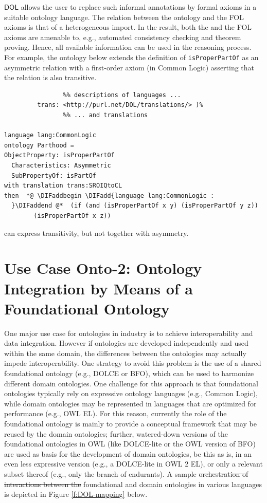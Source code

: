 \documentclass[10pt,fleqn,final]{scrreprt}
\newcommand*{\DOL}{\ensuremath{\mathsf{DOL}}\xspace}
\newenvironment{definitions}[0]{\medskip }{}
\providecommand{\DIFadd}[1]{{\protect\color{blue}\uwave{#1}}} %
\providecommand{\DIFdel}[1]{{\protect\color{red}\sout{#1}}}                      %
\providecommand{\DIFaddbegin}{} %
\providecommand{\DIFaddend}{} %
\providecommand{\DIFdelbegin}{} %
\providecommand{\DIFdelend}{} %
\begin{document}
\begin{definitions}
\DOL allows the user to replace such informal annotations by formal axioms in a suitable ontology 
language. The relation between the \OWL ontology and the FOL axioms is that of a heterogeneous 
import. In the result, both the \OWL and the FOL axioms are amenable to, e.g., automated consistency 
checking and theorem proving. Hence, all available information can be used in the reasoning process.
For example, the ontology below extends the \OWL definition of \texttt{isProperPartOf} as an asymmetric relation
with a first-order axiom (in Common Logic) asserting that the relation is also transitive.
\begin{lstlisting}[basicstyle=\small\ttfamily,language=dolText,alsolanguage=clif,alsolanguage=owl2Manchester,escapechar=@,mathescape]
	 %prefix( lang:  <http://purl.net/DOL/languages/>
                %% descriptions of languages ...
         trans: <http://purl.net/DOL/translations/> )%
                %% ... and translations

language lang:CommonLogic
ontology Parthood =
ObjectProperty: isProperPartOf  
  Characteristics: Asymmetric  
  SubPropertyOf: isPartOf 
with translation trans:SROIQtoCL
then  *@ \DIFaddbegin \DIFadd{language lang:CommonLogic :
  }\DIFaddend @*  (if (and (isProperPartOf x y) (isProperPartOf y z)) 
        (isProperPartOf x z))
\end{lstlisting}
\OWL can express transitivity, but not together with asymmetry.

\section{Use Case Onto-2: Ontology Integration by Means of a Foundational Ontology}\DIFaddbegin \label{onto-2}
\DIFaddend One major use case for ontologies in industry is to achieve interoperability and data integration. 
However if ontologies are developed independently and used  within the same domain, the 
differences between the ontologies may actually impede interoperability. One strategy to avoid this 
problem is the use of a shared  foundational ontology (e.g., DOLCE or BFO), which can be used to 
harmonize different domain ontologies. One challenge for this approach is that foundational 
ontologies typically rely on expressive ontology languages (e.g., Common Logic), while domain 
ontologies may be represented in languages that are optimized for performance (e.g., OWL EL). For 
this reason, currently the role of the foundational ontology is mainly to provide a conceptual 
framework that may be reused by the  domain ontologies; further, watered-down versions of the 
foundational ontologies in OWL (like DOLCE-lite or the OWL version of BFO) are used as basis for 
the  development of domain ontologies, be this as is, in an even less expressive version (e.g., a 
DOLCE-lite in OWL 2 EL), or only a relevant subset thereof (e.g., only the branch of endurants). A 
sample \DIFdelbegin \DIFdel{orchestration of interactions between  the }\DIFdelend \DIFaddbegin \DIFadd{interplay between  }\DIFaddend foundational and domain ontologies in various 
languages is depicted in Figure \ref{f:DOL-mapping} below.


\end{definitions}
\end{document}
